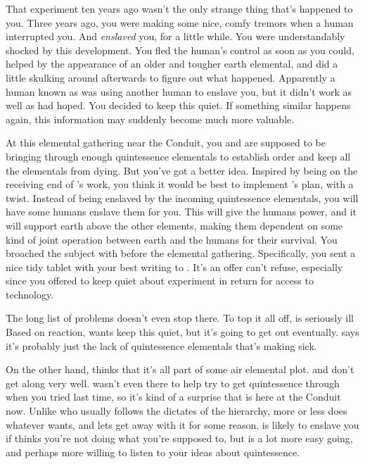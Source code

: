 \documentclass[char]{elementals}
\begin{document}
That experiment ten years ago wasn't the only strange thing that's happened to you.  Three years ago, you were making some nice, comfy tremors when a human interrupted you.  And {\em enslaved} you, for a little while.  You were understandably shocked by this development.  You fled the human's control as soon as you could, helped by the appearance of an older and tougher earth elemental, and did a little skulking around afterwards to figure out what happened.  Apparently a human known as \cMS{\intro} was using another human to enslave you, but it didn't work as well as \cMS{\they} had hoped.  You decided to keep this quiet.  If something similar happens again, this information may suddenly become much more valuable.

At this elemental gathering near the Conduit, you and \cLoyal{} are supposed to be bringing through enough quintessence elementals to establish order and keep all the elementals from dying.  But you've got a better idea.  Inspired by being on the receiving end of \cMS{}'s work, you think it would be best to implement \cLoyal{}'s plan, with a twist.  Instead of being enslaved by the incoming quintessence elementals, you will have some humans enslave them for you.  This will give the humans power, and it will support earth above the other elements, making them dependent on some kind of joint operation between earth and the humans for their survival.  You broached the subject with \cMS{} before the elemental gathering.  Specifically, you sent a nice tidy tablet with your best writing to \cMS{\them}.  It's an offer \cMS{} can't refuse, especially since you offered to keep quiet about \cMS{\their} experiment in return for access to \cMS{\their} technology.

The long list of problems doesn't even stop there.  To top it all off, \cEarthKing{} is seriously ill  Based on \cEarthKing{\their} reaction, \cLoyal{} wants keep this quiet, but it's going to get out eventually.  \cLoyal{} says it's probably just the lack of quintessence elementals that's making \cEarthKing{\them} sick.

On the other hand, \cRogue{\intro} thinks that it's all part of some air elemental plot.  \cLoyal{} and \cRogue{} don't get along very well.  \cRogue{} wasn't even there to help try to get quintessence through when you tried last time, so it's kind of a surprise that \cRogue{\they} is here at the Conduit now.  Unlike \cLoyal{} who usually follows the dictates of the hierarchy, \cRogue{} more or less does whatever  wants, and \cEarthKing{} lets \cRogue{\them} get away with it for some reason.  \cLoyal{} is likely to enslave you if  thinks you're not doing what you're supposed to, but \cRogue{} is a lot more easy going, and perhaps more willing to listen to your ideas about quintessence.
\end{document}
